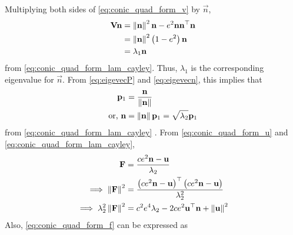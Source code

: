 \documentclass[journal,12pt,onecolumn]{IEEEtran}
\renewcommand\thesection{\arabic{section}}
\begin{document}
\begin{enumerate}[label=\thesection.\arabic*.,ref=\thesection.\theenumi]
Multiplying both sides of    \eqref{eq:conic_quad_form_v} by $\vec{n}$,
\begin{align}
\mathbf{V} \mathbf{n}&=\left\lVert\mathbf{n}\right\rVert^2\mathbf{n}-e^2\mathbf{n}\mathbf{n}^{\top}\mathbf{n} 
\\
&=\left\lVert\mathbf{n}\right\rVert^2\left(1-e^2\right)\mathbf{n} 
 \\
  &=\lambda_1 \mathbf{n} 
	\\
  \label{eq:eigevecn}
\end{align}  
from \eqref{eq:conic_quad_form_lam_cayley}.
Thus,  $\lambda_1$ is the corresponding eigenvalue for $\vec{n}$.  From       \eqref{eq:eigevecP} and \eqref{eq:eigevecn}, this implies that 
\begin{align}  
	\mathbf{p}_1 &= \frac{\mathbf{n}}{\left\lVert\mathbf{n}\right\rVert} 
	\\
	\text{or, }
   \mathbf{n}&= \left\lVert\mathbf{n}\right\rVert\mathbf{p}_1  = \sqrt{\lambda_2}\mathbf{p}_1 
\end{align}  
from   \eqref{eq:conic_quad_form_lam_cayley} .
From \eqref{eq:conic_quad_form_u} and \eqref{eq:conic_quad_form_lam_cayley},
\begin{align}
\mathbf{F}  &= \frac{ce^2\mathbf{n}-\mathbf{u}}{\lambda_2}
 \\
 \implies \left\lVert\mathbf{F}\right\rVert^2  &= \frac{\left(ce^2\mathbf{n}-\mathbf{u}\right)^{\top}\left(ce^2\mathbf{n}-\mathbf{u}\right)}{\lambda_2^2}
 \\
 \implies \lambda_2^2\left\lVert\mathbf{F}\right\rVert^2  &= c^2e^4\lambda_2-2ce^2\mathbf{u}^{\top}\mathbf{n}+\left\lVert\mathbf{u}\right\rVert^2
 \label{eq:conic_quad_form_u_temp}
    \end{align}
    Also, \eqref{eq:conic_quad_form_f} can be expressed as
    \begin{align}

\end{align}
\end{enumerate}
\end{document}
